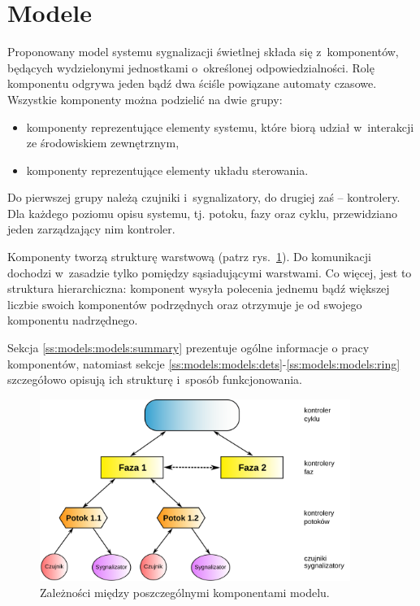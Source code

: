 \documentclass{pracamgr}
\newcommand{\imgr}[1]{rys.~\ref{#1}}
\theoremstyle{plain}
\begin{document}
\section{Modele}
\label{s:models:models}
Proponowany model systemu sygnalizacji świetlnej składa się
z~komponentów, będących wydzielonymi jednostkami o~określonej
odpowiedzialności. Rolę komponentu odgrywa jeden bądź dwa ściśle
powiązane automaty czasowe. Wszystkie komponenty można podzielić na
dwie grupy:
\begin{itemize}
  \item komponenty reprezentujące elementy systemu, które biorą udział
  w~interakcji ze środowiskiem zewnętrznym,
  \item komponenty reprezentujące elementy układu sterowania.
\end{itemize}
Do pierwszej grupy należą czujniki i~sygnalizatory, do drugiej zaś --
kontrolery. Dla każdego poziomu opisu systemu, tj. potoku, fazy oraz
cyklu, przewidziano jeden zarządzający nim kontroler.

Komponenty tworzą strukturę warstwową (patrz \imgr{img:hierarchy}). Do
komunikacji dochodzi w~zasadzie tylko pomiędzy sąsiadującymi
warstwami. Co więcej, jest to struktura hierarchiczna: komponent
wysyła polecenia jednemu bądź większej liczbie swoich komponentów
podrzędnych oraz otrzymuje je od swojego komponentu nadrzędnego.

Sekcja \ref{ss:models:models:summary} prezentuje ogólne informacje o
pracy komponentów, natomiast sekcje
\ref{ss:models:models:dets}-\ref{ss:models:models:ring} szczegółowo
opisują ich strukturę i~sposób funkcjonowania.

\begin{figure}[h]
  \centering
  \includegraphics[width=0.9\textwidth]{img/models-hierarchy}
  \caption{Zależności między poszczególnymi komponentami modelu.}
  \label{img:hierarchy}
\end{figure}
\end{document}

